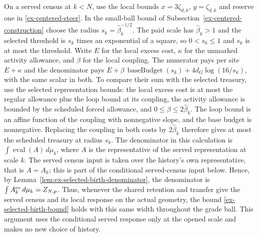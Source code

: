 On a served census at $k<N$, use the local bounds
$x=3\zeta_{d,k}$, $y=\zeta_{d,k}$ and reserve one in
\eqref{ex-centered-steer}. In the small-ball bound of
Subsection~\ref{ex-centered-construction} choose the radius
$s_k=\widehat\beta_k^{-1/2}$. The paid scale has
$\widehat\beta_k>1$ and the selected threshold is $s_k$ times an
exponential of a square, so $0<s_k\le1$ and $s_k$ is at most the
threshold. Write $E$ for the local excess cost, $\kappa$ for the
unmarked activity allowance, and $\beta$ for the local coupling.
The numerator pays per site $E+\kappa$ and the denominator pays
$E+\beta\,\operatorname{baseBudget}(s_k)+4d_G\log(16/s_k)$,
with the same scalar in both. To compare their sum with the selected
treasury, use the selected representation bounds: the local excess
cost is at most the regular allowance plus the loop bound at its
coupling, the activity allowance is bounded by the scheduled forced
allowance, and $0\le\beta\le2\widehat\beta_k$. The loop bound is an
affine function of the coupling with nonnegative slope, and the
base budget is nonnegative. Replacing the coupling in both costs
by $2\widehat\beta_k$ therefore gives at most the scheduled treasury
at radius $s_k$. The denominator in this calculation is
$\int\operatorname{eval}(A)\,d\mu_k$, where $A$ is the representative of
the served representation at scale $k$. The served census input is
taken over the history's own representative, that is $A=A_k$; this is
part of the conditional served-census input below. Hence, by
Lemma~\ref{lem:ex-selected-birth-denominator}, the denominator is
$\int A_k^{\rm ev}\,d\mu_k=Z_{N,p}$.
Thus, whenever the shared retention and transfer give the served
census and its local response on the actual geometry, the bound
\eqref{ex-selected-birth-bound} holds with this same width throughout
the grade ball. This argument uses the conditional served response
only at the opened scale and makes no new choice of history.
